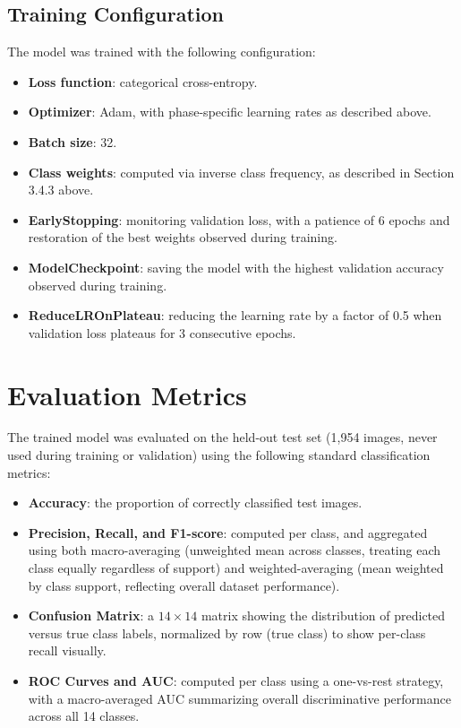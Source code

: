 \documentclass[12pt,a4paper,oneside]{report}
\begin{document}
\subsection{Training Configuration}
\label{sec:training}
The model was trained with the following configuration:
\begin{itemize}
    \item \textbf{Loss function}: categorical cross-entropy.
    \item \textbf{Optimizer}: Adam, with phase-specific learning rates as described above.
    \item \textbf{Batch size}: 32.
    \item \textbf{Class weights}: computed via inverse class frequency, as described in Section 3.4.3 above.
    \item \textbf{EarlyStopping}: monitoring validation loss, with a patience of 6 epochs and restoration of the
          best weights observed during training.
    \item \textbf{ModelCheckpoint}: saving the model with the highest validation accuracy observed during
          training.
    \item \textbf{ReduceLROnPlateau}: reducing the learning rate by a factor of 0.5 when validation loss plateaus
          for 3 consecutive epochs.
\end{itemize}

\section{Evaluation Metrics}
The trained model was evaluated on the held-out test set (1,954 images, never used during training or
validation) using the following standard classification metrics:
\begin{itemize}
    \item \textbf{Accuracy}: the proportion of correctly classified test images.
    \item \textbf{Precision, Recall, and F1-score}: computed per class, and aggregated using both macro-averaging
          (unweighted mean across classes, treating each class equally regardless of support) and
          weighted-averaging (mean weighted by class support, reflecting overall dataset performance).
    \item \textbf{Confusion Matrix}: a $14 \times 14$ matrix showing the distribution of predicted versus true
          class labels, normalized by row (true class) to show per-class recall visually.
    \item \textbf{ROC Curves and AUC}: computed per class using a one-vs-rest strategy, with a macro-averaged AUC
          summarizing overall discriminative performance across all 14 classes.
\end{itemize}
\end{document}
